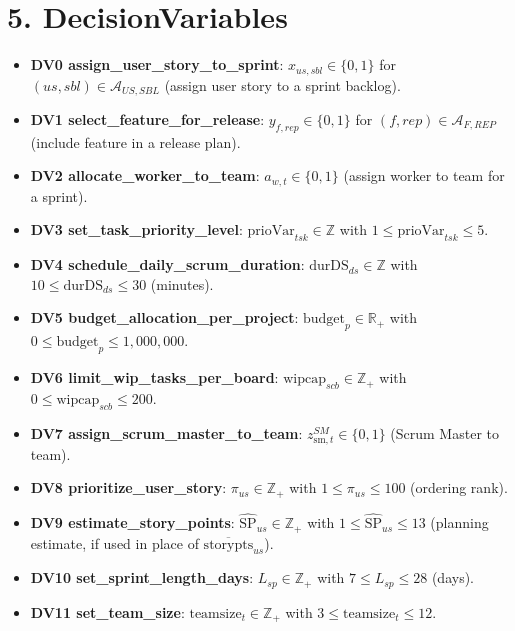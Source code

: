 \documentclass[11pt,a4paper]{article}
\begin{document}
\section{5. DecisionVariables}
\begin{itemize}
  \item \textbf{DV0 assign\_user\_story\_to\_sprint}:\newline
  $x_{us,sbl}\in\{0,1\}$ for $(us,sbl)\in\mathcal{A}_{US,SBL}$ (assign user story to a sprint backlog).
  \item \textbf{DV1 select\_feature\_for\_release}:\newline
  $y_{f,rep}\in\{0,1\}$ for $(f,rep)\in\mathcal{A}_{F,REP}$ (include feature in a release plan).
  \item \textbf{DV2 allocate\_worker\_to\_team}:\newline
  $a_{w,t}\in\{0,1\}$ (assign worker to team for a sprint).
  \item \textbf{DV3 set\_task\_priority\_level}:\newline
  $\text{prioVar}_{tsk}\in\mathbb{Z}$ with $1\le \text{prioVar}_{tsk}\le 5$.
  \item \textbf{DV4 schedule\_daily\_scrum\_duration}:\newline
  $\text{durDS}_{ds}\in\mathbb{Z}$ with $10\le \text{durDS}_{ds}\le 30$ (minutes).
  \item \textbf{DV5 budget\_allocation\_per\_project}:\newline
  $\text{budget}_{p}\in\mathbb{R}_{+}$ with $0\le \text{budget}_{p}\le 1{,}000{,}000$.
  \item \textbf{DV6 limit\_wip\_tasks\_per\_board}:\newline
  $\text{wipcap}_{scb}\in\mathbb{Z}_{+}$ with $0\le \text{wipcap}_{scb}\le 200$.
  \item \textbf{DV7 assign\_scrum\_master\_to\_team}:\newline
  $z^{SM}_{\text{sm},t}\in\{0,1\}$ (Scrum Master to team).
  \item \textbf{DV8 prioritize\_user\_story}:\newline
  $\pi_{us}\in\mathbb{Z}_{+}$ with $1\le \pi_{us}\le 100$ (ordering rank).
  \item \textbf{DV9 estimate\_story\_points}:\newline
  $\widehat{\text{SP}}_{us}\in\mathbb{Z}_{+}$ with $1\le \widehat{\text{SP}}_{us}\le 13$ (planning estimate, if used in place of $\overline{\text{storypts}}_{us}$).
  \item \textbf{DV10 set\_sprint\_length\_days}:\newline
  $L_{sp}\in\mathbb{Z}_{+}$ with $7\le L_{sp}\le 28$ (days).
  \item \textbf{DV11 set\_team\_size}:\newline
  $\text{teamsize}_{t}\in\mathbb{Z}_{+}$ with $3\le \text{teamsize}_{t}\le 12$.
\end{itemize}
\end{document}
